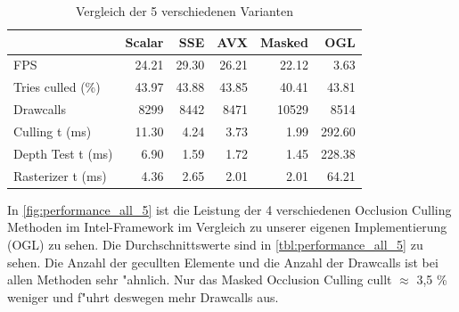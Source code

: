\documentclass[journal]{vgtc}
\begin{document}
\begin{table}
	\begin{tabular}{| l | r | r | r | r | r |}
		\hline
		                   & Scalar  & SSE     & AVX      & Masked    & OGL      \\ \hline
		FPS                & 24.21   & 29.30   & 26.21    & 22.12     & 3.63     \\ \hline
		Tries culled (\%)  & 43.97   & 43.88   & 43.85    & 40.41     & 43.81    \\ \hline
		Drawcalls          & 8299    & 8442    & 8471     & 10529     & 8514     \\ \hline
		Culling t (ms)     & 11.30   & 4.24    & 3.73     & 1.99      & 292.60   \\ \hline
		Depth Test t (ms)  & 6.90    & 1.59    & 1.72     & 1.45      & 228.38   \\ \hline
		Rasterizer t (ms)  & 4.36    & 2.65    & 2.01     & 2.01      & 64.21    \\ 
		\hline
	\end{tabular}
	\caption{Vergleich der 5 verschiedenen Varianten}
	\label{tbl:performance_all_5}
\end{table}


In \autoref{fig:performance_all_5} ist die Leistung der 4 verschiedenen Occlusion Culling Methoden im Intel-Framework im Vergleich zu unserer eigenen Implementierung (OGL) zu sehen.
Die Durchschnittswerte sind in \autoref{tbl:performance_all_5} zu sehen.
Die Anzahl der gecullten Elemente und die Anzahl der Drawcalls ist bei allen Methoden sehr "ahnlich.
Nur das Masked Occlusion Culling cullt $\approx$ 3,5 \% weniger und f"uhrt deswegen mehr Drawcalls aus.
\end{document}
